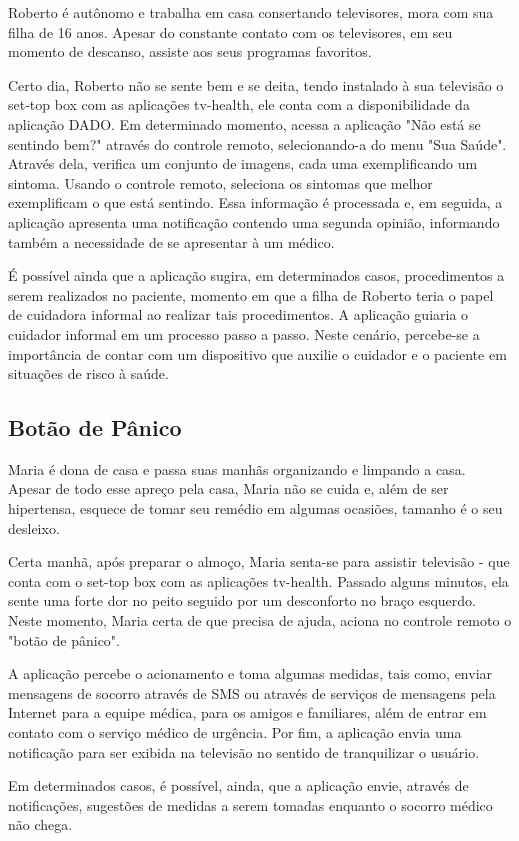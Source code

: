 Roberto é autônomo e trabalha em casa consertando televisores, mora com sua
filha de 16 anos. Apesar do constante contato com os televisores, em seu momento
de descanso, assiste aos seus programas favoritos.

Certo dia, Roberto não se sente bem e se deita, tendo instalado à sua televisão
o set-top box com as aplicações tv-health, ele conta com a disponibilidade da
aplicação DADO. Em determinado momento, acessa a aplicação "Não está se sentindo
bem?" através do controle remoto, selecionando-a do menu "Sua Saúde". Através
dela, verifica um conjunto de imagens, cada uma exemplificando um sintoma.
Usando o controle remoto, seleciona os sintomas que melhor exemplificam o que
está sentindo. Essa informação é processada e, em seguida, a aplicação apresenta
uma notificação contendo uma segunda opinião, informando também a necessidade de
se apresentar à um médico.

É possível ainda que a aplicação sugira, em determinados casos, procedimentos a
serem realizados no paciente, momento em que a filha de Roberto teria o papel de
cuidadora informal ao realizar tais procedimentos. A aplicação guiaria o
cuidador informal em um processo passo a passo. Neste cenário,  percebe-se a
importância de contar com um dispositivo que auxilie o cuidador e o paciente em
situações de risco à saúde.

\subsection{Botão de Pânico}\label{subsec:botao-panico}

Maria é dona de casa e passa suas manhãs organizando e limpando a casa. Apesar
de todo esse apreço pela casa, Maria não se cuida e, além de ser hipertensa,
esquece de tomar seu remédio em algumas ocasiões, tamanho é o seu desleixo.

Certa manhã, após preparar o almoço, Maria senta-se para assistir televisão -
que conta com o set-top box com as aplicações tv-health. Passado
alguns minutos, ela sente uma forte dor no peito seguido por um desconforto no
braço esquerdo. Neste momento, Maria certa de que precisa de ajuda, aciona no
controle remoto o "botão de pânico".

A aplicação percebe o acionamento e toma algumas medidas, tais como, enviar
mensagens de socorro através de SMS ou através de serviços de mensagens pela
Internet para a equipe médica, para os amigos e familiares, além de entrar em
contato com o serviço médico de urgência. Por fim, a aplicação envia uma
notificação para ser exibida na televisão no sentido de tranquilizar o usuário.

Em determinados casos, é possível, ainda, que a aplicação envie, através de
notificações, sugestões de medidas a serem tomadas enquanto o socorro médico não
chega.
